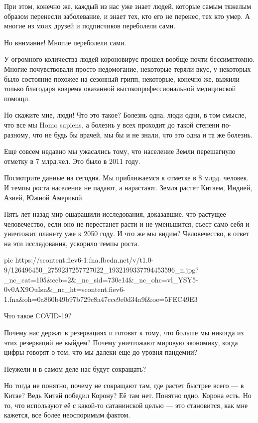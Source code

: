 При этом, конечно же, каждый из нас уже знает людей, которые самым тяжелым
образом перенесли заболевание, и знает тех, кто его не перенес, тех кто умер. А
многие из моих друзей и подписчиков переболели сами. 

Но внимание! Многие переболели сами. 

У огромного количества людей короновирус прошел вообще почти бессимптомно.
Многие почувствовали просто недомогание, некоторые теряли вкус, у некоторых
было состояние похожее на сезонный грипп, некоторые, конечно же, выжили только
благодаря вовремя оказанной высокопрофессиональной медицинской помощи. 

Но скажите мне, люди! Что это такое? Болезнь одна, люди одни, в том смысле, что
все мы  Homo sapiens, а болезнь у всех проходит до такой степени по-разному,
что не будь бы врачей, мы бы и не знали, что это одна и та же болезнь. 

Еще совсем недавно мы ужасались тому, что население Земли перешагнуло отметку в 7 млрд.чел. Это было в 2011 году. 

Посмотрите данные на сегодня. Мы приближаемся к отметке в 8 млрд. человек. И
темпы роста населения не падают, а нарастают. Земля растет Китаем, Индией,
Азией, Южной Америкой. 

Пять лет назад мир ошарашили исследования, доказавшие, что растущее
человечество, если оно не перестанет расти и не уменьшится, съест само себя и
уничтожит планету уже к 2050 году. И что же мы видим? Человечество, в ответ на
эти исследования, ускорило темпы роста. 

\ifcmt
pic https://scontent.fiev6-1.fna.fbcdn.net/v/t1.0-9/126496450_2759237257727022_1932199337794453596_n.jpg?_nc_cat=105&ccb=2&_nc_sid=730e14&_nc_ohc=vl_YSY5-0v0AX9OuIsn&_nc_ht=scontent.fiev6-1.fna&oh=0a860b49b97b729c8a47cce9e0d34a9f&oe=5FEC49E3
\fi

Что такое COVID-19? 

Почему нас держат в резервациях и готовят к тому, что больше мы никогда из этих
резерваций не выйдем? Почему уничтожают мировую экономику, когда цифры говорят
о том, что мы далеки еще до уровня пандемии? 

Неужели и в самом деле нас будут сокращать? 

Но тогда не понятно, почему не сокращают там, где растет быстрее всего --- в
Китае? Ведь Китай победил Корону? Её там нет.  Понятно одно. Корона есть. Но
то, что используют её с какой-то сатанинской целью --- это становится, как мне
кажется, все более неоспоримым фактом.
